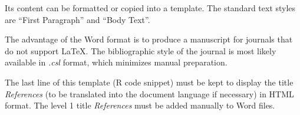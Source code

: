\documentclass[fleqn,10pt]{latex/stylish_article} %
\begin{document}
Its content can be formatted or copied into a template.
The standard text styles are \enquote{First Paragraph} and \enquote{Body Text}.

The advantage of the Word format is to produce a manuscript for journals that do not support LaTeX.
The bibliographic style of the journal is most likely available in \emph{.csl} format, which minimizes manual preparation.

The last line of this template (R code snippet) must be kept to display the title \emph{References} (to be translated into the document language if necessary) in HTML format.
The level 1 title \emph{References} must be added manually to Word files.



\makeatletter

\makeatother


\end{document}
